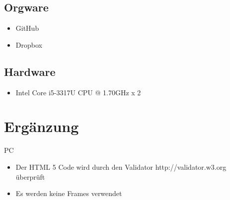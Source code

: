 \documentclass[a4paper]{scrreprt}
\begin{document}
    \section{Orgware}
        \begin{itemize}
        	\item GitHub
        	\item Dropbox
        \end{itemize}
        
    \section{Hardware}
        \begin{itemize}
        	\item Intel Core i5-3317U CPU @ 1.70GHz x 2
        \end{itemize}
        
        
        
\chapter{Ergänzung}
\begin{tiny}
PC
\end{tiny}

	\begin{itemize}
	\item Der HTML 5 Code wird durch den Validator
	http://validator.w3.org überprüft
	\item Es werden keine Frames verwendet
	\end{itemize}        
        
        
        
        
        
\printnoidxglossaries
\end{document}
